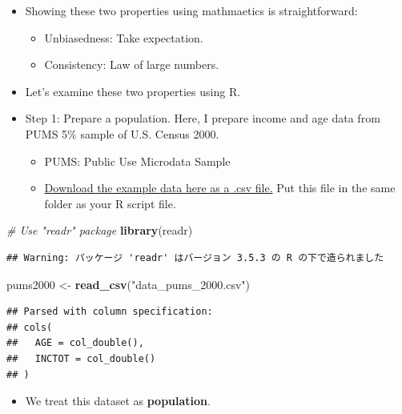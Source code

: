 \documentclass[]{book}
\newenvironment{Shaded}{\begin{snugshade}}{\end{snugshade}}
\newcommand{\KeywordTok}[1]{\textcolor[rgb]{0.13,0.29,0.53}{\textbf{#1}}}
\newcommand{\StringTok}[1]{\textcolor[rgb]{0.31,0.60,0.02}{#1}}
\newcommand{\CommentTok}[1]{\textcolor[rgb]{0.56,0.35,0.01}{\textit{#1}}}
\newcommand{\NormalTok}[1]{#1}
\providecommand{\tightlist}{%
  \setlength{\itemsep}{0pt}\setlength{\parskip}{0pt}}
\begin{document}
\begin{itemize}
\item
  Showing these two properties using mathmaetics is straightforward:

  \begin{itemize}
  \tightlist
  \item
    Unbiasedness: Take expectation.
  \item
    Consistency: Law of large numbers.
  \end{itemize}
\item
  Let's examine these two properties using R.
\item
  Step 1: Prepare a population. Here, I prepare income and age data from
  PUMS 5\% sample of U.S. Census 2000.

  \begin{itemize}
  \tightlist
  \item
    PUMS: Public Use Microdata Sample
  \item
    \href{data_pums_2000.csv}{Download the example data here as a .csv
    file.} Put this file in the same folder as your R script file.
  \end{itemize}
\end{itemize}

\begin{Shaded}
\begin{Highlighting}[]
\CommentTok{# Use "readr" package}
\KeywordTok{library}\NormalTok{(readr)}
\end{Highlighting}
\end{Shaded}

\begin{verbatim}
## Warning: パッケージ 'readr' はバージョン 3.5.3 の R の下で造られました
\end{verbatim}

\begin{Shaded}
\begin{Highlighting}[]
\NormalTok{pums2000 <-}\StringTok{ }\KeywordTok{read_csv}\NormalTok{(}\StringTok{"data_pums_2000.csv"}\NormalTok{) }
\end{Highlighting}
\end{Shaded}

\begin{verbatim}
## Parsed with column specification:
## cols(
##   AGE = col_double(),
##   INCTOT = col_double()
## )
\end{verbatim}

\begin{itemize}
\tightlist
\item
  We treat this dataset as \textbf{population}.
\end{itemize}
\end{document}
